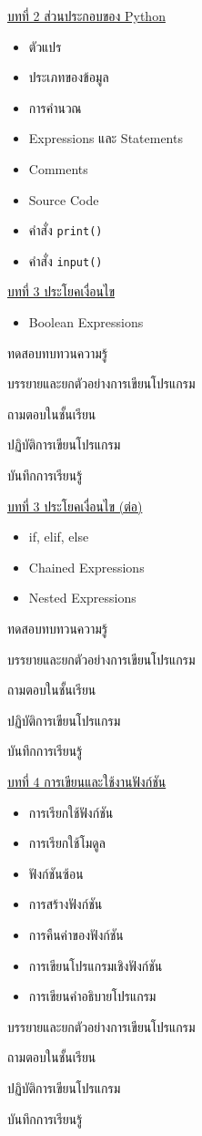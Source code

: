 {
\underline{บทที่ 2 ส่วนประกอบของ Python}
\begin{itemize}
\item ตัวแปร
\item ประเภทของข้อมูล
\item การคำนวณ
\item Expressions และ Statements
\item Comments
\item Source Code
\item คำสั่ง  \texttt{print()}
\item คำสั่ง  \texttt{input()}
\end{itemize}
\underline{บทที่ 3 ประโยคเงื่อนไข}
\begin{itemize}
\item Boolean Expressions
\end{itemize}

}
{
\item ทดสอบทบทวนความรู้
\item บรรยายและยกตัวอย่างการเขียนโปรแกรม
\item ถามตอบในชั้นเรียน
\item ปฏิบัติการเขียนโปรแกรม
\item บันทึกการเรียนรู้
}

{
\underline{บทที่ 3 ประโยคเงื่อนไข (ต่อ)}
\begin{itemize}
\item if, elif, else
\item Chained Expressions
\item Nested Expressions
\end{itemize}
}
{
\item ทดสอบทบทวนความรู้
\item  บรรยายและยกตัวอย่างการเขียนโปรแกรม
\item  ถามตอบในชั้นเรียน
\item  ปฏิบัติการเขียนโปรแกรม
\item  บันทึกการเรียนรู้
}
{
\underline{บทที่ 4 การเขียนและใช้งานฟังก์ชัน}
\begin{itemize}
\item การเรียกใช้ฟังก์ชัน
\item การเรียกใช้โมดูล
\item ฟังก์ชันซ้อน
\item การสร้างฟังก์ชัน
\item การคืนค่าของฟังก์ชัน
\item การเขียนโปรแกรมเชิงฟังก์ชัน
\item การเขียนคำอธิบายโปรแกรม
\end{itemize}
}
{
\item  บรรยายและยกตัวอย่างการเขียนโปรแกรม
\item  ถามตอบในชั้นเรียน
\item  ปฏิบัติการเขียนโปรแกรม
\item  บันทึกการเรียนรู้
}

